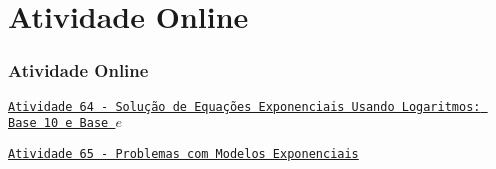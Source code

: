 \section{Atividade Online}
\begin{frame}
\frametitle{Atividade Online} 

\href{https://pt.khanacademy.org/math/algebra2/exponential-and-logarithmic-functions/solving-exponential-equations-with-logarithms/e/using-logarithms-to-solve-exponential-equations}
{{\tt Atividade 64 - Solução de Equações Exponenciais Usando
Logaritmos: Base 10 e Base $e$}}


\href{https://pt.khanacademy.org/math/algebra2/exponential-and-logarithmic-functions/solving-exponential-models/e/exponential-models-word-problems}
{{\tt Atividade 65 - Problemas com Modelos Exponenciais}}



\end{frame}